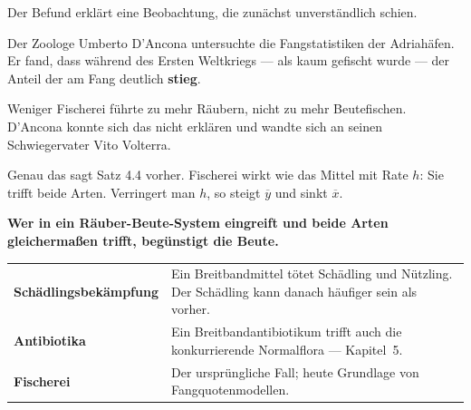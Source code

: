 \begin{warnung}
Der Befund erklärt eine Beobachtung, die zunächst unverständlich schien.

Der Zoologe Umberto D'Ancona untersuchte die Fangstatistiken der Adriahäfen. Er fand, dass während des Ersten Weltkriegs --- als kaum gefischt wurde --- der Anteil der  am Fang deutlich \textbf{stieg}.

\begin{center}
\begin{minipage}{0.9\textwidth}
Weniger Fischerei führte zu mehr Räubern, nicht zu mehr Beutefischen. D'Ancona konnte sich das nicht erklären und wandte sich an seinen Schwiegervater Vito Volterra.
\end{minipage}
\end{center}

Genau das sagt Satz 4.4 vorher. Fischerei wirkt wie das Mittel mit Rate $h$: Sie trifft beide Arten. Verringert man $h$, so steigt $\overline y$ und sinkt $\overline x$.

\begin{center}
\begin{minipage}{0.9\textwidth}
\textbf{Wer in ein Räuber-Beute-System eingreift und beide Arten gleichermaßen trifft, begünstigt die Beute.}
\end{minipage}
\end{center}

\begin{center}
{\small
\renewcommand{\arraystretch}{1.5}
\begin{tabular}{@{}P{2.6cm}P{6.0cm}@{}}
\toprule
\textbf{Schädlings\-bekämpfung} & Ein Breitbandmittel tötet Schädling und Nützling. Der Schädling kann danach häufiger sein als vorher.\\
\textbf{Antibiotika} & Ein Breitbandantibiotikum trifft auch die konkurrierende Normalflora --- Kapitel~5.\\
\textbf{Fischerei} & Der ursprüngliche Fall; heute Grundlage von Fangquotenmodellen.\\
\bottomrule
\end{tabular}}
\end{center}

\begin{center}
\begin{minipage}{0.88\textwidth}
\end{minipage}
\end{center}
\end{warnung}

